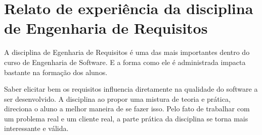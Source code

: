 \section[Relato de experiência da disciplina de Engenharia de Requisitos]{Relato de experiência da disciplina de Engenharia de Requisitos}
A disciplina de Egenharia de Requisitos é uma das mais importantes dentro do
curso de Engenharia de Software. E a forma como ele é administrada impacta bastante
na formação dos alunos.

Saber elicitar bem os requisitos influencia diretamente na qualidade do software
a ser desenvolvido. A disciplina ao propor uma mistura de teoria e prática,
direciona o aluno a melhor maneira de se fazer isso. Pelo fato de trabalhar com
um problema real e um cliente real, a parte prática da disciplina se torna mais
interessante e válida.
